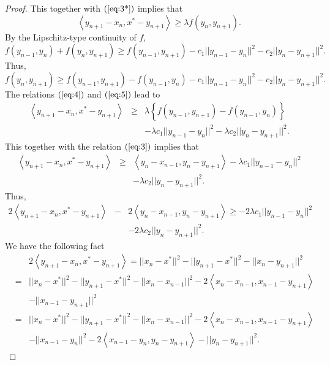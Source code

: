 \documentclass{aims}
\theoremstyle{definition}
\begin{document}
\begin{proof}
This together with $(\ref{eq:3*})$ implies that 
\begin{equation}\label{eq:4}
\left\langle y_{n+1}-x_n,x^*-y_{n+1}\right\rangle\ge \lambda f(y_n,y_{n+1}).
\end{equation}
By the Lipschitz-type continuity of $f$,
\begin{equation*}
f(y_{n-1},y_n)+f(y_n,y_{n+1})\ge f(y_{n-1},y_{n+1})-c_1||y_{n-1}-y_n||^2-c_2||y_n-y_{n+1}||^2.
\end{equation*}
Thus,
\begin{equation}\label{eq:5}
f(y_n,y_{n+1})\ge f(y_{n-1},y_{n+1})-f(y_{n-1},y_n)-c_1||y_{n-1}-y_n||^2-c_2||y_n-y_{n+1}||^2.
\end{equation}
The relations $(\ref{eq:4})$ and $(\ref{eq:5})$ lead to
\begin{eqnarray*}
\left\langle y_{n+1}-x_n,x^*-y_{n+1}\right\rangle&\ge& \lambda\left\{f(y_{n-1},y_{n+1})-f(y_{n-1},y_n)\right\}\nonumber\\
&&-\lambda c_1||y_{n-1}-y_n||^2-\lambda c_2||y_n-y_{n+1}||^2.\label{eq:6}
\end{eqnarray*}
This together with the relation $(\ref{eq:3})$ implies that
\begin{eqnarray*}
\left\langle y_{n+1}-x_n,x^*-y_{n+1}\right\rangle&\ge& \left\langle y_{n}-x_{n-1},y_{n}-y_{n+1}\right\rangle-\lambda c_1||y_{n-1}-y_n||^2\nonumber\\
&&-\lambda c_2||y_n-y_{n+1}||^2.
\end{eqnarray*}
Thus,
\begin{eqnarray}\label{eq:7}
2\left\langle y_{n+1}-x_n,x^*-y_{n+1}\right\rangle&-& 2\left\langle y_{n}-x_{n-1},y_{n}-y_{n+1}\right\rangle\ge-2\lambda c_1||y_{n-1}-y_n||^2\nonumber\\
&&-2\lambda c_2||y_n-y_{n+1}||^2.
\end{eqnarray}
We have the following fact
\begin{eqnarray}
&&2\left\langle y_{n+1}-x_n,x^*-y_{n+1}\right\rangle=||x_n-x^*||^2-||y_{n+1}-x^*||^2-||x_n-y_{n+1}||^2\nonumber\\ 
&=& ||x_n-x^*||^2-||y_{n+1}-x^*||^2-||x_n-x_{n-1}||^2-2\left\langle x_n-x_{n-1},x_{n-1}-y_{n+1}\right\rangle\nonumber\\
&&-||x_{n-1}-y_{n+1}||^2\nonumber\\
&=&||x_n-x^*||^2-||y_{n+1}-x^*||^2-||x_n-x_{n-1}||^2-2\left\langle x_n-x_{n-1},x_{n-1}-y_{n+1}\right\rangle\nonumber\\
&&-||x_{n-1}-y_{n}||^2-2\left\langle x_{n-1}-y_{n},y_{n}-y_{n+1}\right\rangle-||y_{n}-y_{n+1}||^2.\label{eq:8**}

\end{eqnarray}
\end{proof}
\end{document}
